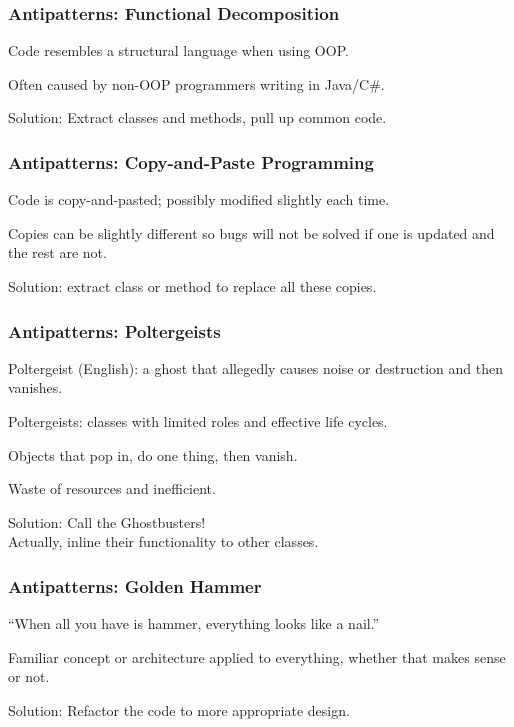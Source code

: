 \begin{frame}
\frametitle{Antipatterns: Functional Decomposition}
\begin{changemargin}{1cm}
Code resembles a structural language when using OOP.

Often caused by non-OOP programmers writing in Java/C\#.

Solution: Extract classes and methods, pull up common code.

\end{changemargin}
\end{frame}

\begin{frame}
\frametitle{Antipatterns: Copy-and-Paste Programming}
\begin{changemargin}{1cm}
Code is copy-and-pasted; possibly modified slightly each time.

Copies can be slightly different so bugs will not be solved if one is updated and the rest are not.

Solution: extract class or method to replace all these copies.

\end{changemargin}
\end{frame}

\begin{frame}
\frametitle{Antipatterns: Poltergeists}
\begin{changemargin}{1cm}
Poltergeist (English): a ghost that allegedly causes noise or destruction and then vanishes.

Poltergeists: classes with limited roles and effective life cycles.

Objects that pop in, do one thing, then vanish.

Waste of resources and inefficient.

Solution: Call the Ghostbusters!\\
\quad\quad Actually, inline their functionality to other classes.


\end{changemargin}
\end{frame}

\begin{frame}
\frametitle{Antipatterns: Golden Hammer}
\begin{changemargin}{1cm}
``When all you have is hammer, everything looks like a nail.''

Familiar concept or architecture applied to everything, whether that makes sense or not.

Solution: Refactor the code to more appropriate design.

\end{changemargin}
\end{frame}

